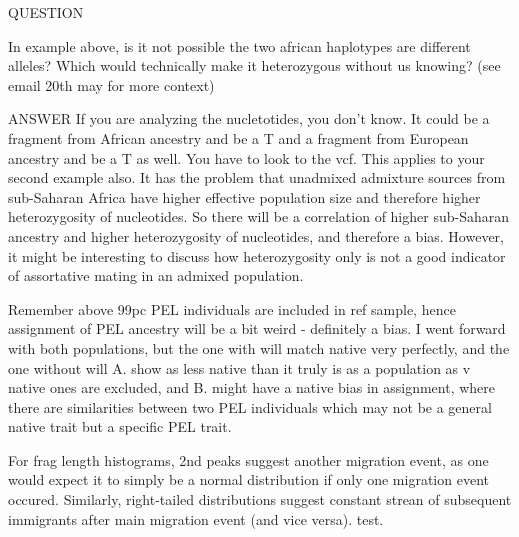 \documentclass[11pt]{article}
\begin{document}
QUESTION

In example above, is it not possible the two african haplotypes are different alleles? Which would technically make it heterozygous without us knowing?
(see email 20th may for more context)

ANSWER
If you are analyzing the nucletotides, you don't know. It could be a fragment from African ancestry and be a T and a fragment from European ancestry and be a T as well. You have to look to the vcf. This applies to your second example also.
It has the problem that unadmixed admixture sources from sub-Saharan Africa have higher effective population size and therefore higher heterozygosity of nucleotides. So there will be a correlation of higher sub-Saharan ancestry and higher heterozygosity of nucleotides, and therefore a bias. However, it might be interesting to discuss how heterozygosity only is not a good indicator of assortative mating in an admixed population. 

Remember above 99pc PEL individuals are included in ref sample, hence assignment of PEL ancestry will be a bit weird - definitely a bias. I went forward with both populations, but the one with will match native very perfectly, and the one without will A. show as less native than it truly is as a population as v native ones are excluded, and B. might have a native bias in assignment, where there are similarities between two PEL individuals which may not be a general native trait but a specific PEL trait. 


For frag length histograms, 2nd peaks suggest another migration event, as one would expect it to simply be a normal distribution if only one migration event occured. Similarly, right-tailed distributions suggest constant strean of subsequent immigrants after main migration event (and vice versa). test.


\end{document}
